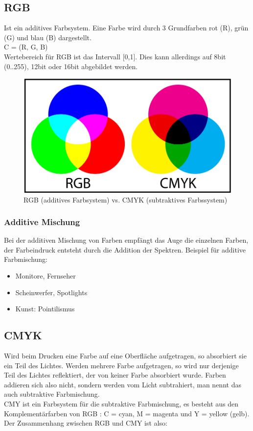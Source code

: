 \subsection{RGB} 
Ist ein additives Farbsystem. Eine Farbe wird durch 3 Grundfarben rot (R), grün (G) und blau (B) dargestellt. \\
C = (R, G, B)\\
Wertebereich für RGB ist das Intervall [0,1]. Dies kann allerdings auf 8bit (0..255), 12bit oder 16bit abgebildet werden.
\begin{figure}[!ht]
\centering
\includegraphics[width=0.7\linewidth]{fig/RGBvCMYK}
\caption{RGB (additives Farbsystem) vs. CMYK (subtraktives Farbssystem)}
\label{fig:rgbundcmyk}
\end{figure}
\subsubsection{Additive Mischung}
Bei der additiven Mischung von Farben empfängt das Auge die einzelnen Farben, der Farbeindruck entsteht durch die Addition der Spektren. Beispiel für additive Farbmischung:
\begin{itemize}[leftmargin=1cm]
    \item Monitore, Fernseher
    \item Scheinwerfer, Spotlights
    \item Kunst: Pointilismus
\end{itemize}


\subsection{CMYK} 
Wird beim Drucken eine Farbe auf eine Oberfläche aufgetragen, so absorbiert sie ein Teil des Lichtes. Werden mehrere Farbe aufgetragen, so wird nur derjenige Teil des Lichtes reflektiert, der von keiner Farbe absorbiert wurde. Farben addieren sich also nicht, sondern werden vom Licht subtrahiert, man nennt das auch subtraktive Farbmischung.\\
CMY ist ein Farbsystem für die subtraktive Farbmischung, es besteht aus den Komplementärfarben von RGB : C = cyan, M = magenta und Y = yellow (gelb).\\
Der Zusammenhang zwischen RGB und CMY ist also:

